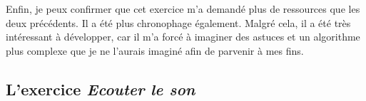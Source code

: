 Enfin, je peux confirmer que cet exercice m'a demandé plus de ressources que les deux précédents. Il a été plus chronophage également. Malgré cela, il a été très intéressant à développer, car il m'a forcé à imaginer des astuces et un algorithme plus complexe que je ne l'aurais imaginé afin de parvenir à mes fins.

\subsection{L'exercice \textit{Ecouter le son}}
